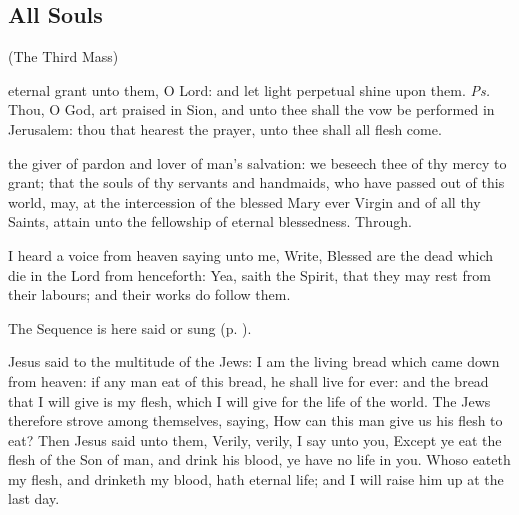 \subsection{All Souls}

\centerline{\small{(The Third Mass)}}\label{AllSoulsIII}

\vspace{0.25\baselineskip}

\introit
{} eternal grant unto them, O Lord: and let light perpetual shine upon them. \textit{Ps.} Thou, O God, art praised in Sion, and unto thee shall the vow be performed in Jerusalem: thou that hearest the prayer, unto thee shall all flesh come.

\collect
{} the giver of pardon and lover of man's salvation: we beseech thee of thy mercy to grant; that the souls of thy servants and handmaids, who have passed out of this world, may, at the intercession of the blessed Mary ever Virgin and of all thy Saints, attain unto the fellowship of eternal blessedness. Through.

 I heard a voice from heaven saying unto me, Write, Blessed are the dead which die in the Lord from henceforth: Yea, saith the Spirit, that they may rest from their labours; and their works do follow them.

\begin{rubric}
    The Sequence  is here said or sung (p. \pageref{diesirae}).
\end{rubric}

 Jesus said to the multitude of the Jews: I am the living bread which came down from heaven: if any man eat of this bread, he shall live for ever: and the bread that I will give is my flesh, which I will give for the life of the world. The Jews therefore strove among themselves, saying, How can this man give us his flesh to eat? Then Jesus said unto them, Verily, verily, I say unto you, Except ye eat the flesh of the Son of man, and drink his blood, ye have no life in you. Whoso eateth my flesh, and drinketh my blood, hath eternal life; and I will raise him up at the last day.

